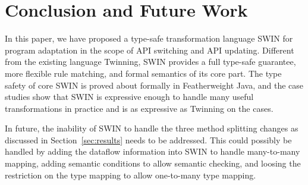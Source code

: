 \section{Conclusion and Future Work}
\label{sec:conclusionsandfutruework}
In this paper, we have proposed a type-safe transformation language
SWIN for program adaptation in the scope of API switching and API
updating. Different from the existing language Twinning, SWIN provides
a full type-safe guarantee, more flexible rule matching, and formal
semantics of its core part. The type safety of core SWIN is proved
about formally in Featherweight Java, and the case studies show that
SWIN is expressive enough to handle many useful transformations in
practice and is as expressive as Twinning on the cases.

In future, the inability of SWIN to handle the three method splitting
changes as discussed in Section~\ref{sec:results} needs to be
addressed. This could possibly be handled by adding the dataflow
information into SWIN to handle many-to-many mapping, adding semantic
conditions to allow semantic checking, and loosing the restriction on
the type mapping to allow one-to-many type mapping.





